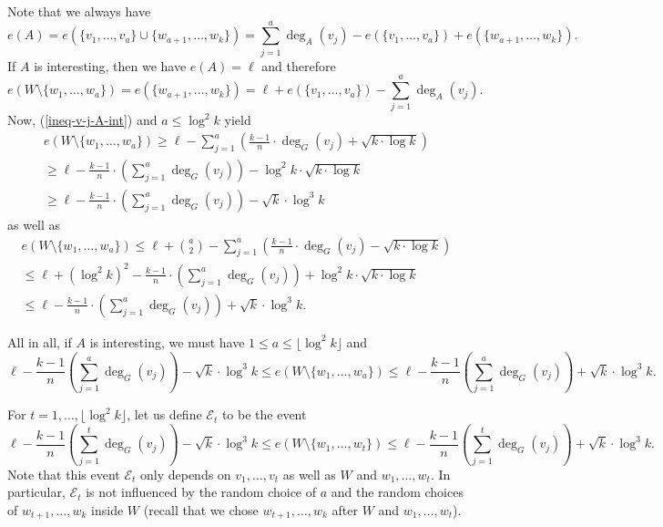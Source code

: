 \documentclass[11pt]{article}
\theoremstyle{definition}
\numberwithin{equation}{section}
\begin{document}
Note that we always have
\[e(A)=e(\lbrace v_1,\dots,v_a\rbrace\cup \lbrace w_{a+1},\dots,w_k\rbrace)=\sum_{j=1}^{a}\deg_A(v_j)-e(\lbrace v_1,\dots,v_a\rbrace)+e(\lbrace w_{a+1},\dots,w_k\rbrace).\]
If $A$ is interesting, then we have $e(A)=\ell$ and therefore
\[e(W\setminus \lbrace w_{1},\dots,w_a\rbrace)=e(\lbrace w_{a+1},\dots,w_k\rbrace)=\ell+e(\lbrace v_1,\dots,v_a\rbrace)-\sum_{j=1}^{a}\deg_A(v_j).\]
Now, (\ref{ineq-v-j-A-int}) and $a\leq \log^2 k$ yield
\begin{multline*}
e(W\setminus \lbrace w_{1},\dots,w_a\rbrace)\geq \ell-\sum_{j=1}^{a}\left(\frac{k-1}{n}\cdot \deg_G(v_j)+\sqrt{k\cdot \log k}\right)\\
\geq \ell-\frac{k-1}{n}\cdot\left(\sum_{j=1}^{a}\deg_G(v_j)\right)-\log^2 k\cdot \sqrt{k\cdot \log k}\\
\geq \ell-\frac{k-1}{n}\cdot\left(\sum_{j=1}^{a}\deg_G(v_j)\right)-\sqrt{k}\cdot \log^3 k
\end{multline*}
as well as
\begin{multline*}
e(W\setminus \lbrace w_{1},\dots,w_a\rbrace)\leq \ell+{a\choose 2}-\sum_{j=1}^{a}\left(\frac{k-1}{n}\cdot \deg_G(v_j)-\sqrt{k\cdot \log k}\right)\\
\leq \ell+(\log^2 k)^2-\frac{k-1}{n}\cdot\left(\sum_{j=1}^{a}\deg_G(v_j)\right)+\log^2 k\cdot \sqrt{k\cdot \log k}\\
\leq \ell-\frac{k-1}{n}\cdot\left(\sum_{j=1}^{a}\deg_G(v_j)\right)+\sqrt{k}\cdot \log^3 k.
\end{multline*}

All in all, if $A$ is interesting, we must have $1\leq a\leq \lfloor\log^2 k\rfloor$ and
\[ \ell-\frac{k-1}{n}\left(\sum_{j=1}^{a}\deg_G(v_j)\right)-\sqrt{k}\cdot \log^3 k\leq e(W\setminus \lbrace w_{1},\dots,w_a\rbrace)\leq \ell-\frac{k-1}{n}\left(\sum_{j=1}^{a}\deg_G(v_j)\right)+\sqrt{k}\cdot \log^3 k.\]

For $t=1,\dots,\lfloor\log^2 k\rfloor$, let us define $\mathscr{E}_t$ to be the event
\[ \ell-\frac{k-1}{n}\left(\sum_{j=1}^{t}\deg_G(v_j)\right)-\sqrt{k}\cdot \log^3 k\leq e(W\setminus \lbrace w_{1},\dots,w_t\rbrace)\leq \ell-\frac{k-1}{n}\left(\sum_{j=1}^{t}\deg_G(v_j)\right)+\sqrt{k}\cdot \log^3 k.\]
Note that this event $\mathscr{E}_t$ only depends on $v_1,\dots,v_t$ as well as $W$ and $w_1,\dots,w_t$. In particular, $\mathscr{E}_t$ is not influenced by the random choice of $a$ and the random choices of $w_{t+1},\dots,w_k$ inside $W$ (recall that we chose $w_{t+1},\dots,w_k$ after $W$ and $w_1,\dots,w_t$).
\end{document}
